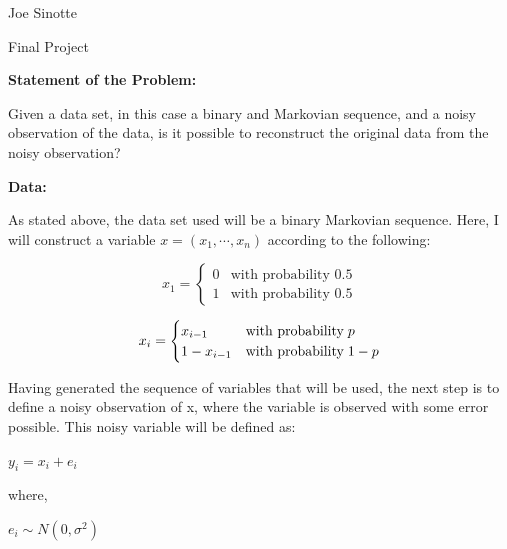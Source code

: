 \documentclass[12pt]{article} %
\begin{document}
\noindent
Joe Sinotte

\vspace{3mm}
\begin{center}
Final Project
\end{center}

\vspace{3mm}
\noindent
\textbf{Statement of the Problem:}

\vspace{3mm}
Given a data set, in this case a binary and Markovian sequence, and a noisy observation of the data, is it possible to reconstruct the original data from the noisy observation?

\vspace{5mm}
\noindent
\textbf{Data:}

\vspace{3mm}
As stated above, the data set used will be a binary Markovian sequence. Here, I will construct a variable $x = (x_{1}, \cdots, x_{n})$ according to the following:  

\vspace{2mm}
\[
x_{1} = 
\begin{cases}
0 & \text{with probability } 0.5 \\
1 & \text{with probability } 0.5
\end{cases}
\]

\vspace{5mm}

\[
x_{i} =
\begin{cases}
x_{i-1} & \text{with probability} \hspace{1mm} p \\
1-x_{i-1} & \text{with probability} \hspace{1mm} 1-p
\end{cases}
\]

\vspace{3mm}
Having generated the sequence of variables that will be used, the next step is to define a noisy observation of x, where the variable is observed with some error possible. This noisy variable will be defined as:

\begin{center}
$y_{i} = x_{i} +e_{i}$
\end{center}

\noindent
where, 

\begin{center}
$e_{i} \sim N(0, \sigma^{2})$
\end{center}
\end{document}
